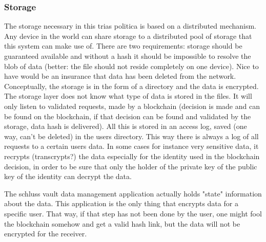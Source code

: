 \documentclass{article}
\begin{document}
\subsubsection{Storage}
The storage necessary in this trias politica is based on a distributed mechanism. Any device in the world can share storage to a distributed pool of storage that this system can make use of. There are two requirements: storage should be guaranteed available and without a hash it should be impossible to resolve the blob of data (better: the file should not reside completely on one device). Nice to have would be an insurance that data has been deleted from the network. Conceptually, the storage is in the form of a directory and the data is encrypted. The storage layer does not know what type of data is stored in the files. It will only listen to validated requests, made by a blockchain (decision is made and can be found on the blockchain, if that decision can be found and validated by the storage, data hash is delivered). All this is stored in an access log, saved (one way, can't be deleted) in the users directory. This way there is always a log of all requests to a certain users data. In some cases for instance very sensitive data, it recrypts (transcrypts?) the data especially for the identity used in the blockchain decision, in order to be sure that only the holder of the private key of the public key of the identity can decrypt the data.

The schluss vault data management application actually holds "state" information about the data. This application is the only thing that encrypts data for a specific user. That way, if that step has not been done by the user, one might fool the blockchain somehow and get a valid hash link, but the data will not be encrypted for the receiver.
\end{document}
